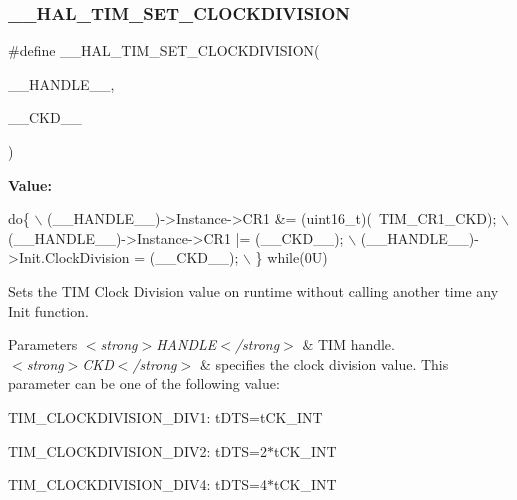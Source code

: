 \subsubsection{\texorpdfstring{\+\_\+\+\_\+\+H\+A\+L\+\_\+\+T\+I\+M\+\_\+\+S\+E\+T\+\_\+\+C\+L\+O\+C\+K\+D\+I\+V\+I\+S\+I\+ON}{\_\_HAL\_TIM\_SET\_CLOCKDIVISION}}
{\footnotesize\ttfamily \#define \+\_\+\+\_\+\+H\+A\+L\+\_\+\+T\+I\+M\+\_\+\+S\+E\+T\+\_\+\+C\+L\+O\+C\+K\+D\+I\+V\+I\+S\+I\+ON(\begin{DoxyParamCaption}\item[{}]{\+\_\+\+\_\+\+H\+A\+N\+D\+L\+E\+\_\+\+\_\+,  }\item[{}]{\+\_\+\+\_\+\+C\+K\+D\+\_\+\+\_\+ }\end{DoxyParamCaption})}

{\bfseries Value\+:}
\begin{DoxyCode}
\textcolor{keywordflow}{do}\{                                                             \(\backslash\)
                              (\_\_HANDLE\_\_)->Instance->CR1 &= (uint16\_t)(~TIM\_CR1\_CKD);  \(\backslash\)
                              (\_\_HANDLE\_\_)->Instance->CR1 |= (\_\_CKD\_\_);                 \(\backslash\)
                              (\_\_HANDLE\_\_)->Init.ClockDivision = (\_\_CKD\_\_);             \(\backslash\)
                          \} \textcolor{keywordflow}{while}(0U)
\end{DoxyCode}


Sets the T\+IM Clock Division value on runtime without calling another time any Init function. 


\begin{DoxyParams}{Parameters}
{\em $<$strong$>$\+H\+A\+N\+D\+L\+E$<$/strong$>$} & T\+IM handle. \\
\hline
{\em $<$strong$>$\+C\+K\+D$<$/strong$>$} & specifies the clock division value. This parameter can be one of the following value\+: \begin{DoxyItemize}
\item T\+I\+M\+\_\+\+C\+L\+O\+C\+K\+D\+I\+V\+I\+S\+I\+O\+N\+\_\+\+D\+I\+V1\+: t\+D\+TS=t\+C\+K\+\_\+\+I\+NT \item T\+I\+M\+\_\+\+C\+L\+O\+C\+K\+D\+I\+V\+I\+S\+I\+O\+N\+\_\+\+D\+I\+V2\+: t\+D\+TS=2$\ast$t\+C\+K\+\_\+\+I\+NT \item T\+I\+M\+\_\+\+C\+L\+O\+C\+K\+D\+I\+V\+I\+S\+I\+O\+N\+\_\+\+D\+I\+V4\+: t\+D\+TS=4$\ast$t\+C\+K\+\_\+\+I\+NT \end{DoxyItemize}
\\
\hline
\end{DoxyParams}

